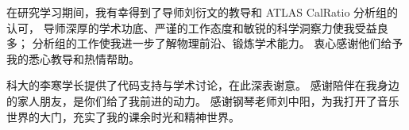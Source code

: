 
\begin{acknowledgements}

    在研究学习期间，我有幸得到了导师刘衍文的教导和 ATLAS CalRatio 分析组的认可，
    导师深厚的学术功底、严谨的工作态度和敏锐的科学洞察力使我受益良多；
    分析组的工作使我进一步了解物理前沿、锻炼学术能力。
    衷心感谢他们给予我的悉心教导和热情帮助。

    科大的李寒学长提供了代码支持与学术讨论，在此深表谢意。
    感谢陪伴在我身边的家人朋友，是你们给了我前进的动力。
    感谢钢琴老师刘中阳，为我打开了音乐世界的大门，充实了我的课余时光和精神世界。

\end{acknowledgements}
